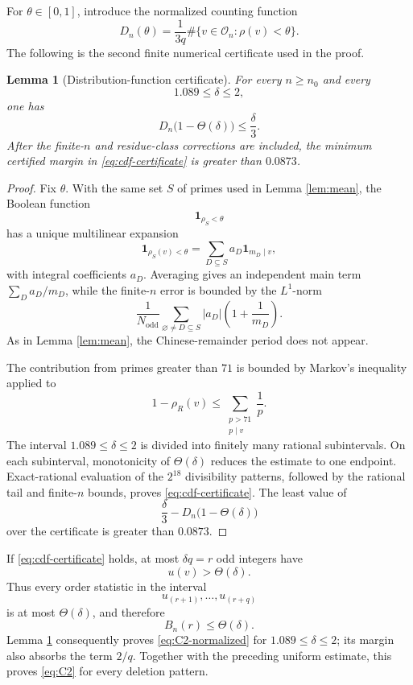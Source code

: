 \documentclass{article}
\newtheorem{lemma}[theorem]{Lemma}
\theoremstyle{remark}
\newcommand{\ind}{\mathbf{1}}
\newcommand{\Ocal}{\mathcal{O}}
\begin{document}
For \(\theta\in[0,1]\), introduce the normalized counting function
\[
 D_n(\theta)=
 \frac1{3q}
 \#\{v\in\Ocal_n:\rho(v)<\theta\}.
\]
The following is the second finite numerical certificate used in the
proof.

\begin{lemma}[Distribution-function certificate]\label{lem:cdf}
For every \(n\geq n_0\) and every
\[
 1.089\leq\delta\leq2,
\]
one has
\begin{equation}\label{eq:cdf-certificate}
 D_n\bigl(1-\Theta(\delta)\bigr)\leq\frac{\delta}{3}.
\end{equation}
After the finite-\(n\) and residue-class corrections are included, the
minimum certified margin in \eqref{eq:cdf-certificate} is greater than
\(0.0873\).
\end{lemma}

\begin{proof}
Fix \(\theta\). With the same set \(S\) of primes used in Lemma
\ref{lem:mean}, the Boolean function
\[
 \ind_{\rho_S<\theta}
\]
has a unique multilinear expansion
\[
 \ind_{\rho_S(v)<\theta}
 =
 \sum_{D\subseteq S}a_D\ind_{m_D\mid v},
\]
with integral coefficients \(a_D\). Averaging gives an independent
main term \(\sum_Da_D/m_D\), while the finite-\(n\) error is bounded by
the \(L^1\)-norm
\[
 \frac1{N_{\mathrm{odd}}}
 \sum_{\varnothing\neq D\subseteq S}
 |a_D|\left(1+\frac1{m_D}\right).
\]
As in Lemma \ref{lem:mean}, the Chinese-remainder period does not
appear.

The contribution from primes greater than \(71\) is bounded by
Markov's inequality applied to
\[
 1-\rho_R(v)
 \leq
 \sum_{\substack{p>71\\p\mid v}}\frac1p.
\]
The interval \(1.089\leq\delta\leq2\) is divided into finitely many
rational subintervals. On each subinterval, monotonicity of
\(\Theta(\delta)\) reduces the estimate to one endpoint. Exact-rational
evaluation of the \(2^{18}\) divisibility patterns, followed by the
rational tail and finite-\(n\) bounds, proves
\eqref{eq:cdf-certificate}. The least value of
\[
 \frac{\delta}{3}
 -
 D_n\bigl(1-\Theta(\delta)\bigr)
\]
over the certificate is greater than \(0.0873\).
\end{proof}

If \eqref{eq:cdf-certificate} holds, at most \(\delta q=r\) odd
integers have
\[
 u(v)>\Theta(\delta).
\]
Thus every order statistic in the interval
\[
 u_{(r+1)},\ldots,u_{(r+q)}
\]
is at most \(\Theta(\delta)\), and therefore
\[
 B_n(r)\leq\Theta(\delta).
\]
Lemma \ref{lem:cdf} consequently proves \eqref{eq:C2-normalized} for
\(1.089\leq\delta\leq2\); its margin also absorbs the term \(2/q\).
Together with the preceding uniform estimate, this proves
\eqref{eq:C2} for every deletion pattern.
\end{document}
